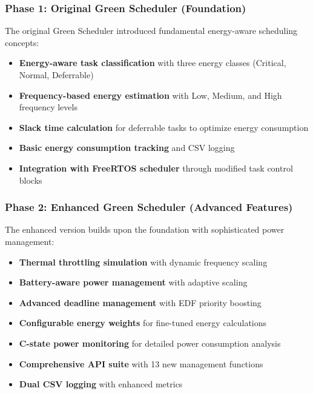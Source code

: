 \documentclass[11pt,a4paper]{article}
\begin{document}
\subsubsection{Phase 1: Original Green Scheduler (Foundation)}
The original Green Scheduler introduced fundamental energy-aware scheduling concepts:
\begin{itemize}
    \item \textbf{Energy-aware task classification} with three energy classes (Critical, Normal, Deferrable)
    \item \textbf{Frequency-based energy estimation} with Low, Medium, and High frequency levels
    \item \textbf{Slack time calculation} for deferrable tasks to optimize energy consumption
    \item \textbf{Basic energy consumption tracking} and CSV logging
    \item \textbf{Integration with FreeRTOS scheduler} through modified task control blocks
\end{itemize}

\subsubsection{Phase 2: Enhanced Green Scheduler (Advanced Features)}
The enhanced version builds upon the foundation with sophisticated power management:
\begin{itemize}
    \item \textbf{Thermal throttling simulation} with dynamic frequency scaling
    \item \textbf{Battery-aware power management} with adaptive scaling
    \item \textbf{Advanced deadline management} with EDF priority boosting
    \item \textbf{Configurable energy weights} for fine-tuned energy calculations
    \item \textbf{C-state power monitoring} for detailed power consumption analysis
    \item \textbf{Comprehensive API suite} with 13 new management functions
    \item \textbf{Dual CSV logging} with enhanced metrics
\end{itemize}
\end{document}
